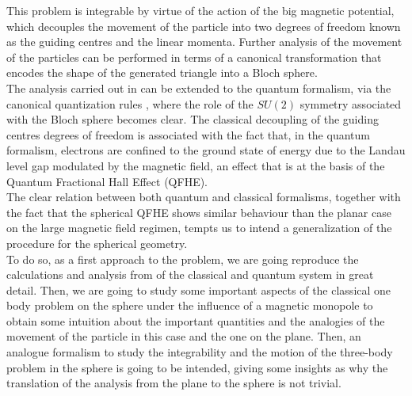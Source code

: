This problem is integrable by virtue of the action of the big magnetic potential, which decouples the movement of  the particle into two degrees of freedom known as the guiding centres and the linear momenta. Further analysis of the movement of the particles can be performed in terms of a canonical transformation that encodes the shape of the generated triangle into a Bloch sphere.\\

The analysis carried out in \cite{alonso} can be extended to the quantum formalism, via the canonical quantization rules \cite{cq}, where the role of the $SU(2)$ symmetry associated with the Bloch sphere becomes clear. The classical decoupling of the guiding centres degrees of freedom is associated with the fact that, in the quantum formalism, electrons are confined to the ground state of energy due to the Landau level gap modulated by the magnetic field, an effect that is at the basis of the Quantum Fractional Hall Effect (QFHE).\\

The clear relation between both quantum and classical formalisms, together with the fact that the spherical QFHE shows similar behaviour than the planar case on the large magnetic field regimen, tempts us to intend a generalization of the procedure for the spherical geometry.  \\

To do so, as a first approach to the problem, we are going reproduce the calculations and analysis from \cite{alonso} of the classical and quantum system in great detail. Then, we are going to study some important aspects of the classical one body problem on the sphere under the influence of a magnetic monopole to obtain some intuition about the important quantities and the analogies of the movement of the particle in this case and the one on the plane. Then, an analogue formalism to study the integrability and the motion of the three-body problem in the sphere is going to be intended, giving some insights as why the translation of the analysis from the plane to the sphere is not trivial.
